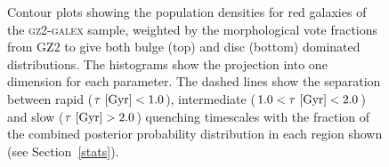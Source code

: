 \begin{figure}
\caption[Population densities of red smooth and disc galaxies]{Contour plots showing the population densities for red galaxies of the \textsc{gz2-galex} sample, weighted by the morphological vote fractions from GZ2 to give both bulge (top) and disc (bottom) dominated distributions. The histograms show the projection into one dimension for each parameter. The dashed lines show the separation between rapid ($\tau ~\rm{[Gyr]} < 1.0$), intermediate ($1.0 < \tau ~\rm{[Gyr]} < 2.0$) and slow ($\tau ~\rm{[Gyr]} > 2.0$) quenching timescales with the fraction of the combined posterior probability distribution in each region shown (see Section~\ref{stats}).}
\label{red_s}
\end{figure}

